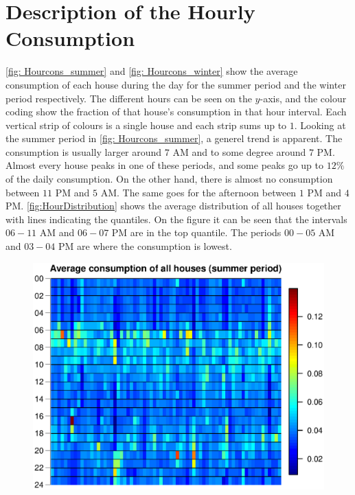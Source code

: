 \section{Description of the Hourly Consumption}
\noindent \cref{fig: Hourcons_summer} and \cref{fig: Hourcons_winter} show the average consumption of each house during the day for the summer period and the winter period respectively. The different hours can be seen on the $y$-axis, and the colour coding show the fraction of that house's consumption in that hour interval. Each vertical strip of colours is a single house and each strip sums up to $1$. Looking at the summer period in \cref{fig: Hourcons_summer}, a generel trend is apparent. The consumption is usually larger around $7$ AM and to some degree around $7$ PM. Almost every house peaks in one of these periods, and some peaks go up to $12\%$ of the daily consumption. On the other hand, there is almost no consumption between $11$ PM and $5$ AM. The same goes for the afternoon between $1$ PM and $4$ PM. \cref{fig:HourDistribution} shows the average distribution of all houses together with lines indicating the quantiles. On the figure it can be seen that the intervals $06-11$ AM and $06-07$ PM are in the top quantile. The periods $00-05$ AM and $03-04$ PM are where the consumption is lowest.
\begin{figure}[ht]
    \centering
    \includegraphics[scale=0.80]{../../../figures/Heatmap_summer.eps}
\end{figure}

